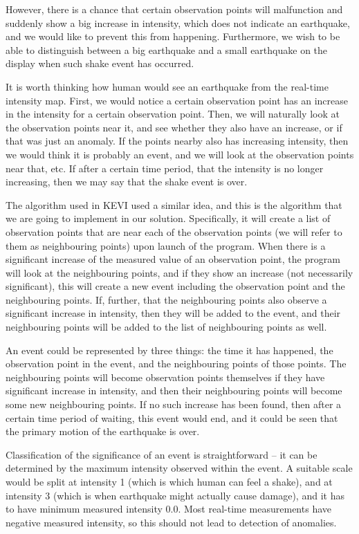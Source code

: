 However, there is a chance that certain observation points will malfunction and suddenly show a big increase in intensity, which does not indicate an earthquake, and we would like to prevent this from happening. Furthermore, we wish to be able to distinguish between a big earthquake and a small earthquake on the display when such shake event has occurred.

It is worth thinking how human would see an earthquake from the real-time intensity map. First, we would notice a certain observation point has an increase in the intensity for a certain observation point. Then, we will naturally look at the observation points near it, and see whether they also have an increase, or if that was just an anomaly. If the points nearby also has increasing intensity, then we would think it is probably an event, and we will look at the observation points near that, etc. If after a certain time period, that the intensity is no longer increasing, then we may say that the shake event is over.

The algorithm used in KEVI used a similar idea, and this is the algorithm that we are going to implement in our solution. Specifically, it will create a list of observation points that are near each of the observation points (we will refer to them as neighbouring points) upon launch of the program. When there is a significant increase of the measured value of an observation point, the program will look at the neighbouring points, and if they show an increase (not necessarily significant), this will create a new event including the observation point and the neighbouring points. If, further, that the neighbouring points also observe a significant increase in intensity, then they will be added to the event, and their neighbouring points will be added to the list of neighbouring points as well.

An event could be represented by three things: the time it has happened, the observation point in the event, and the neighbouring points of those points. The neighbouring points will become observation points themselves if they have significant increase in intensity, and then their neighbouring points will become some new neighbouring points. If no such increase has been found, then after a certain time period of waiting, this event would end, and it could be seen that the primary motion of the earthquake is over.

Classification of the significance of an event is straightforward -- it can be determined by the maximum intensity observed within the event. A suitable scale would be split at intensity 1 (which is which human can feel a shake), and at intensity 3 (which is when earthquake might actually cause damage), and it has to have minimum measured intensity 0.0. Most real-time measurements have negative measured intensity, so this should not lead to detection of anomalies.

